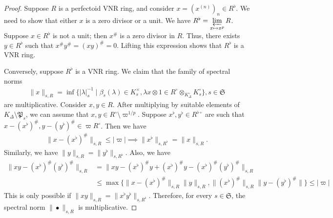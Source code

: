 \documentclass[12pts,a4paper]{amsart}
\begin{document}
\begin{proof}
Suppose $R$ is a perfectoid VNR ring, and consider $x=(x^{(n)})_{n}\in R^\flat$. We need to show that either $x$ is a zero divisor or a unit. We have $R^\flat=\varprojlim\limits_{x\mapsto x^p} R$. Suppose $x\in R^\flat$ is not a unit; then $x^\#$ is a zero divisor in $R$. Thus, there exists $y\in R^\flat$ such that $x^\#y^\#=(xy)^\#=0$. Lifting this expression shows that $R^\flat$ is a VNR ring.

Conversely, suppose $R^\flat$ is a VNR ring. We claim that the family of spectral norms
\begin{align*}
\|x\|_{s,R}=\inf\{|\lambda|^{-1}_s\mid \beta_s(\lambda)\in K^\times_s, \lambda x\otimes 1\in R^\circ\otimes_{K^\circ_\Delta}K^\circ_s\}, s\in\mathfrak{S}
\end{align*}
are multiplicative. Consider $x,y\in R$. After multiplying by suitable elements of $K_\Delta\setminus\mathfrak{P}_s$, we can assume that $x,y\in R^\circ\setminus\varpi^{1/p}$. Suppose $x^\flat,y^\flat\in R^{\flat\circ}$ are such that $x-(x^\flat)^\#,y-(y^\flat)^\#\in \varpi R^\circ$. Then we have
\begin{align*}
\|x-(x^\flat)^\#\|_{s,R}\leq |\varpi|\implies \|x^{\flat}\|_{s,R^\flat}=\|x\|_{s,R}.
\end{align*}
Similarly, we have $\|y\|_{s,R}=\|y^\flat\|_{s,R^\flat}$. Also, we have
\begin{align*}
\|xy-(x^\flat)^\#(y^\flat)^\#\|_{s,R}&=\|xy-(x^\flat)^\#y+(x^\flat)^\#y- (x^\flat)^\#(y^\flat)^\#\|_{s,R}\\
&\leq\max\{\|x-(x^\flat)^\#\|_{s,R}\|y\|_{s,R},\|(x^\flat)^\#\|_{s,R}\|y-(y^\flat)^\#\|\}\leq |\varpi|
\end{align*}
This is only possible if $\|xy\|_{s,R}=\|x^\flat y^\flat\|_{s,R^\flat}$. Therefore, for every $s\in\mathfrak{S}$, the spectral norm $\|\bullet\|_{s,R}$ is multiplicative.


\end{proof}
\end{document}
